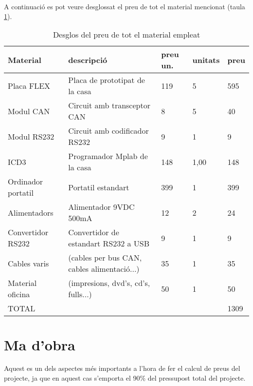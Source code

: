 A continuació es pot veure desglossat el preu de tot el material mencionat (taula \ref{tab:costs:mat}).

\begin{table}[ht!]
	\begin{tabularx}{\linewidth}{l | X | l | l | l}
\textbf{Material}	&\textbf{descripció}	&\textbf{preu un.}	&\textbf{unitats}	&\textbf{preu}\\
\hline
\hline
Placa FLEX	&Placa de prototipat de la casa \FLEX	&119	&5	&595\\
\hline
Modul CAN	&Circuit amb transceptor CAN	&8	&5	&40\\
\hline
Modul RS232	&Circuit amb codificador RS232	&9	&1	&9\\
\hline
ICD3	&Programador Mplab de la casa \Microchip	&148	&1,00	&148\\
\hline
Ordinador portatil	&Portatil estandart	&399	&1	&399\\
\hline
Alimentadors	&Alimentador 9VDC 500mA	&12	&2	&24\\
\hline
Convertidor RS232	&Convertidor de estandart RS232 a USB	&9	&1	&9\\
\hline
Cables varis	&(cables per bus CAN, cables alimentació...)	&35	&1	&35\\
\hline
Material oficina	&(impresions, dvd's, cd's, fulls...)	&50	&1	&50\\
\hline
\hline
TOTAL	&	&	&	&1309\\
\hline
	\end{tabularx}
	\caption[Preu del material necessari]{Desglos del preu de tot el material empleat}
	\label{tab:costs:mat}
\end{table}


\section{Ma d'obra}\label{cap:eco:hora}


Aquest es un dels aspectes més importants a l'hora de fer el calcul de preus del projecte, ja que en aquest cas s'emporta el 90\% del pressupost total del projecte.

